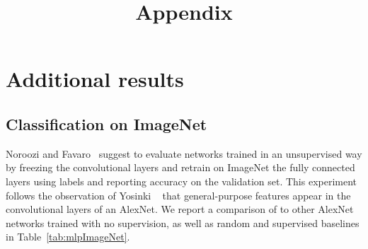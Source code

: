 \title{Appendix}
\author{}
\institute{}
\maketitle
\section{Additional results}

\subsection{Classification on ImageNet}
\label{sec:mlpImageNet}
Noroozi and Favaro~\cite{noroozi2016unsupervised} suggest to evaluate networks trained in an unsupervised way by freezing the convolutional layers and retrain on ImageNet the fully connected layers using labels and reporting accuracy on the validation set.
This experiment follows the observation of Yosinki \etal~\cite{yosinski2014transferable} that general-purpose features appear in the convolutional layers of an AlexNet.
We report a comparison of \OURS to other AlexNet networks trained with no supervision, as well as random and supervised baselines in Table~\ref{tab:mlpImageNet}.

